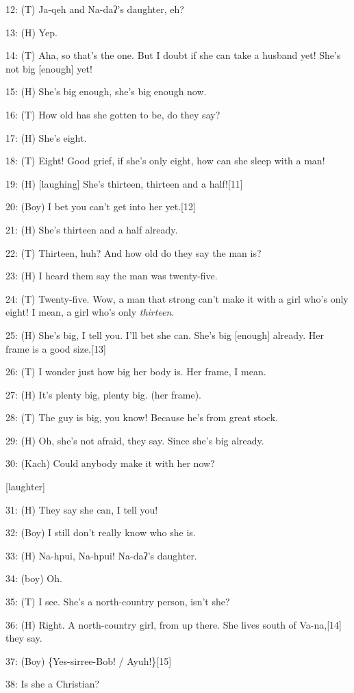12: (T) Ja-qeh and Na-daʔ's daughter, eh?

13: (H) Yep.

14: (T) Aha, so that's the one. But I doubt if she can take a husband yet! She's
not big [enough] yet!

15: (H) She's big enough, she's big enough now.

16: (T) How old has she gotten to be, do they say?

17: (H) She's eight.

18: (T) Eight! Good grief, if she's only eight, how can she sleep with a man!

19: (H) [laughing] She's thirteen, thirteen and a half![11]

20: (Boy) I bet you can't get into her yet.[12]

21: (H) She's thirteen and a half already.

22: (T) Thirteen, huh? And how old do they say the man is?

23: (H) I heard them say the man was twenty-five.

24: (T) Twenty-five. Wow, a man that strong can't make it with a girl who's only
eight! I mean, a girl who's only \textit{thirteen}.

25: (H) She's big, I tell you. I'll bet she can. She's big [enough] already. Her
frame is a good size.[13]

26: (T) I wonder just how big her body is. Her frame, I mean.

27: (H) It's plenty big, plenty big. (her frame).

28: (T) The guy is big, you know! Because he's from great stock.

29: (H) Oh, she's not afraid, they say. Since she's big already.

30: (Kach) Could anybody make it with her now?

[laughter]

31: (H) They say she can, I tell you!

32: (Boy) I still don't really know who she is.

33: (H) Na-hpui, Na-hpui! Na-daʔ's daughter.

34: (boy) Oh.

35: (T) I see. She's a north-country person, isn't she?

36: (H) Right. A north-country girl, from up there. She lives south of Va-na,[14]
they say.

37: (Boy) \{Yes-sirree-Bob! / Ayuh!\}[15]

38: Is she a Christian?

